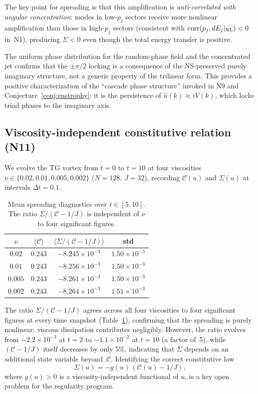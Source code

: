 \documentclass[11pt]{article}
\theoremstyle{definition}
\newcommand{\cC}{\mathcal{C}}
\DeclareMathOperator{\corr}{corr}
\begin{document}
The key point for spreading is that this amplification
is \emph{anti-correlated with angular concentration}:
modes in low-$p_j$ sectors receive more nonlinear
amplification than those in high-$p_j$ sectors
(consistent with $\corr(p_j,dE_j|_{\rm NL})<0$
in~N1), producing $\Sigma<0$ even though the total
energy transfer is positive.

The uniform phase distribution for the random-phase
field and the concentrated jet confirms that the
$\pm\pi/2$ locking is a consequence of the
NS-preserved purely imaginary structure, not a
generic property of the trilinear form.  This
provides a positive characterization of the
``cascade phase structure'' invoked in N9 and
Conjecture~\ref{conj:enstrophy}: it is the persistence
of $\hat u(k)\approx iV(k)$, which locks triad
phases to the imaginary axis.


\subsection{Viscosity-independent constitutive relation (N11)}
\label{sec:constitutive}

We evolve the TG vortex from $t=0$ to $t=10$ at four
viscosities $\nu\in\{0.02, 0.01, 0.005, 0.002\}$
($N=128$, $J=32$), recording $\cC(u)$ and $\Sigma(u)$
at intervals $\Delta t=0.1$.

\begin{table}[h]
\centering
\caption{Mean spreading diagnostics over
$t\in[5,10]$.  The ratio $\Sigma/(\cC-1/J)$ is
independent of $\nu$ to four significant figures.}
\label{tab:constitutive}
\begin{tabular}{@{}cccc@{}}
\toprule
$\nu$ & $\langle\cC\rangle$
  & $\langle\Sigma/(\cC\!-\!1/J)\rangle$
  & std \\
\midrule
$0.02$  & $0.243$ & $-8.245\times 10^{-3}$ & $1.50\times 10^{-3}$ \\
$0.01$  & $0.243$ & $-8.256\times 10^{-3}$ & $1.50\times 10^{-3}$ \\
$0.005$ & $0.243$ & $-8.261\times 10^{-3}$ & $1.50\times 10^{-3}$ \\
$0.002$ & $0.243$ & $-8.264\times 10^{-3}$ & $1.51\times 10^{-3}$ \\
\bottomrule
\end{tabular}
\end{table}

The ratio $\Sigma/(\cC-1/J)$ agrees across all four
viscosities to four significant figures at every time
snapshot (Table~\ref{tab:constitutive}), confirming
that the spreading is purely nonlinear: viscous
dissipation contributes negligibly.  However, the ratio
evolves from $-2.2\times 10^{-3}$ at $t=2$ to
$-1.1\times 10^{-2}$ at $t=10$ (a factor of~5), while
$(\cC-1/J)$ itself decreases by only 5\%, indicating
that $\Sigma$ depends on an additional state variable
beyond~$\cC$.  Identifying the correct constitutive law
\begin{equation}\label{eq:constitutive}
\Sigma(u) = -g(u)\,(\cC(u)-1/J),
\end{equation}
where $g(u)>0$ is a viscosity-independent functional
of $u$, is a key open problem for the regularity
program.
\end{document}
